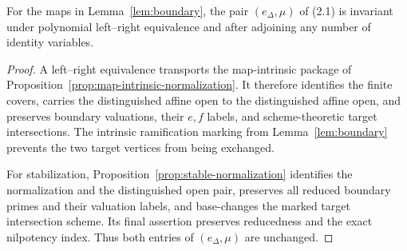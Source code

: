 \begin{lemma}\label{lem:stable}
For the maps in Lemma~\ref{lem:boundary}, the pair $(e_\Delta,\mu)$ of
(2.1) is invariant under polynomial left--right equivalence and after
adjoining any number of identity variables.
\end{lemma}

\begin{proof}
A left--right equivalence transports the map-intrinsic package of
Proposition~\ref{prop:map-intrinsic-normalization}.  It therefore identifies
the finite covers, carries the distinguished affine open to the
distinguished affine open, and preserves boundary valuations, their $e,f$
labels, and scheme-theoretic target intersections.  The intrinsic
ramification marking from Lemma~\ref{lem:boundary} prevents the two target
vertices from being exchanged.

For stabilization, Proposition~\ref{prop:stable-normalization} identifies the
normalization and the distinguished open pair, preserves all reduced
boundary primes and their valuation labels, and base-changes the marked
target intersection scheme.  Its final assertion preserves reducedness and
the exact nilpotency index.  Thus both entries of $(e_\Delta,\mu)$ are
unchanged.
\end{proof}
